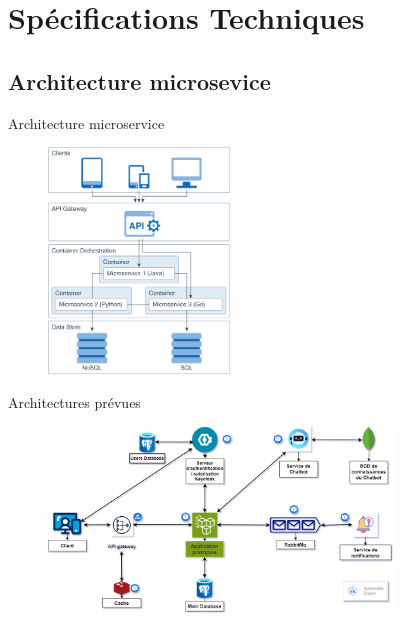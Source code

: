 \documentclass[aspectratio=169]{beamer}
\begin{document}
\section{Spécifications Techniques}



\subsection{Architecture microsevice}



\begin{frame}{Architecture microservice}
   \begin{figure}[htpb]
        \centering
        \includegraphics[height=6cm]{pic/microservice_architecture_presentation.png}
    \end{figure}
\end{frame}


\begin{frame}{Architectures prévues}
    \begin{figure}[htpb]
         \centering
         \includegraphics[height=5cm]{pic/Code212_architecture.drawio (1).png}
     \end{figure}
 \end{frame}
\end{document}
